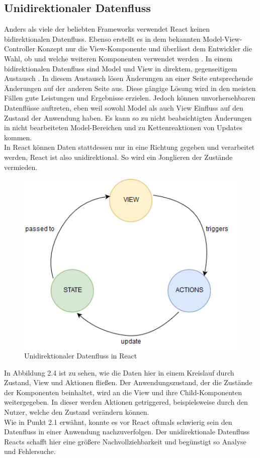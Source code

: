 \subsection{Unidirektionaler Datenfluss}
Anders als viele der beliebten Frameworks verwendet React keinen bidirektionalen Datenfluss. Ebenso erstellt es in dem bekannten Model-View-Controller Konzept nur die View-Komponente und überlässt dem Entwickler die Wahl, ob und welche weiteren Komponenten verwendet werden \cite{5}. In einem bidirektionalen Datenfluss sind Model und View in direktem, gegenseitigem Austausch \cite{5}. In diesem Austausch lösen Änderungen an einer Seite entsprechende Änderungen auf der anderen Seite aus. Diese gängige Lösung wird in den meisten Fällen gute Leistungen und Ergebnisse erzielen. Jedoch können unvorhersehbaren Datenflüsse auftreten, eben weil sowohl Model als auch View Einfluss auf den Zustand der Anwendung haben. Es kann so zu nicht beabsichtigten Änderungen in nicht bearbeiteten Model-Bereichen und zu Kettenreaktionen von Updates kommen.\\
In React können Daten stattdessen nur in eine Richtung gegeben und verarbeitet werden, React ist also unidirektional. So wird ein Jonglieren der Zustände vermieden. \\
\begin{figure}[H]
     \centerline{\includegraphics[width=12cm]{../Abbildungen/dataflow.png}}
  \caption{Unidirektionaler Datenfluss in React \cite{eig}}
  \label{Unidirektionaler Datenfluss in React}
\end{figure}
\clearpage \noindent In Abbildung 2.4 ist zu sehen, wie die Daten hier in einem Kreislauf durch Zustand, View und Aktionen fließen. Der Anwendungszustand, der die Zustände der Komponenten beinhaltet, wird an die View und ihre Child-Komponenten weitergegeben. In dieser werden Aktionen getriggered, beispielsweise durch den Nutzer, welche den Zustand verändern können. \\
Wie in Punkt 2.1 erwähnt, konnte es vor React oftmals schwierig sein den Datenfluss in einer Anwendung nachzuverfolgen. Der unidirektionale Datenfluss Reacts schafft hier eine größere Nachvollziehbarkeit und begünstigt so Analyse und Fehlersuche. \\
